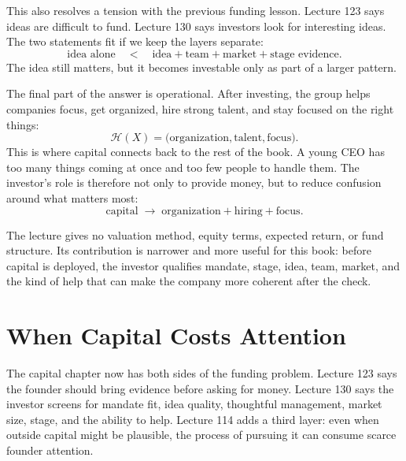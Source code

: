 \documentclass[11pt,oneside]{book}
\begin{document}
This also resolves a tension with the previous funding lesson. Lecture 123 says ideas are difficult to fund. Lecture 130 says investors look for interesting ideas. The two statements fit if we keep the layers separate:
\[
\text{idea alone}
\quad < \quad
\text{idea}+\text{team}+\text{market}+\text{stage evidence}.
\]
The idea still matters, but it becomes investable only as part of a larger pattern.

The final part of the answer is operational. After investing, the group helps companies focus, get organized, hire strong talent, and stay focused on the right things:
\[
\mathcal{H}(X)
=
\bigl(
\text{organization},
\text{talent},
\text{focus}
\bigr).
\]
This is where capital connects back to the rest of the book. A young CEO has too many things coming at once and too few people to handle them. The investor's role is therefore not only to provide money, but to reduce confusion around what matters most:
\[
\text{capital}
\;\longrightarrow\;
\text{organization}+\text{hiring}+\text{focus}.
\]

\begin{remark}
The lecture gives no valuation method, equity terms, expected return, or fund structure. Its contribution is narrower and more useful for this book: before capital is deployed, the investor qualifies mandate, stage, idea, team, market, and the kind of help that can make the company more coherent after the check.
\end{remark}


\section{When Capital Costs Attention}

The capital chapter now has both sides of the funding problem. Lecture 123 says the founder should bring evidence before asking for money. Lecture 130 says the investor screens for mandate fit, idea quality, thoughtful management, market size, stage, and the ability to help. Lecture 114 adds a third layer: even when outside capital might be plausible, the process of pursuing it can consume scarce founder attention.
\end{document}

